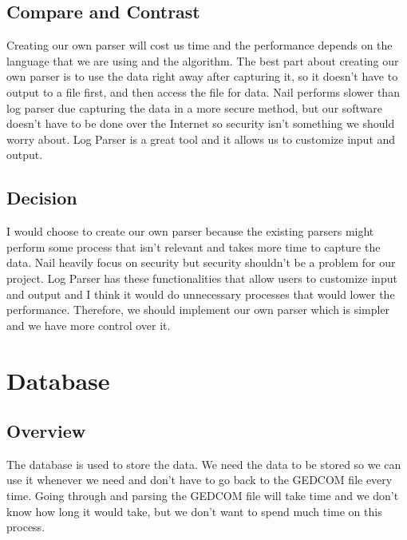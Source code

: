 \documentclass[onecolumn, draftclsnofoot, 10pt, compsoc]{IEEEtran}
\begin{document}
\subsection{Compare and Contrast}
\begin{singlespace}
Creating our own parser will cost us time and the performance depends on the language that we are using and the algorithm. The best part about creating our own parser is to use the data right away after capturing it, so it doesn't have to output to a file first, and then access the file for data. Nail performs slower than log parser due capturing the data in a more secure method, but our software doesn't have to be done over the Internet so security isn't something we should worry about. Log Parser is a great tool and it allows us to customize input and output.
\end{singlespace}

\subsection{Decision}
\begin{singlespace}
I would choose to create our own parser because the existing parsers might perform some process that isn't relevant and takes more time to capture the data. Nail heavily focus on security but security shouldn't be a problem for our project. Log Parser has these functionalities that allow users to customize input and output and I think it would do unnecessary processes that would lower the performance. Therefore, we should implement our own parser which is simpler and we have more control over it.
\end{singlespace}


\section{Database}
\subsection{Overview}
\begin{singlespace}
The database is used to store the data. We need the data to be stored so we can use it whenever we need and don't have to go back to the GEDCOM file every time. Going through and parsing the GEDCOM file will take time and we don't know how long it would take, but we don't want to spend much time on this process. 
\end{singlespace}
\end{document}
